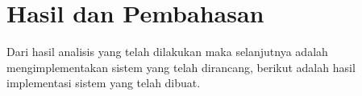\section{Hasil dan Pembahasan}

Dari hasil analisis yang telah dilakukan maka selanjutnya adalah mengimplementakan sistem yang telah dirancang, berikut adalah hasil implementasi sistem yang telah dibuat.





